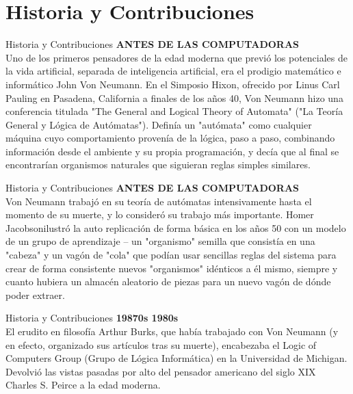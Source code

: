 \documentclass[11pt]{beamer}
\begin{document}
\section{Historia y Contribuciones}
	\begin{frame}{Historia y Contribuciones}
	\justify
	\textbf{ANTES DE LAS COMPUTADORAS}\\
	Uno de los primeros pensadores de la edad moderna que previó los potenciales de la vida artificial, separada de inteligencia artificial, era el prodigio matemático e informático John Von Neumann. En el Simposio Hixon, ofrecido por Linus Carl Pauling en Pasadena, California a finales de los años 40, Von Neumann hizo una conferencia titulada "The General and Logical Theory of Automata" ("La Teoría General y Lógica de Autómatas"). Definía un "autómata" como cualquier máquina cuyo comportamiento provenía de la lógica, paso a paso, combinando información desde el ambiente y su propia programación, y decía que al final se encontrarían organismos naturales que siguieran reglas simples similares. 

	\end{frame}
	
	\begin{frame}{Historia y Contribuciones}
	\justify
	\textbf{ANTES DE LAS COMPUTADORAS}\\
	Von Neumann trabajó en su teoría de autómatas intensivamente hasta el momento de su muerte, y lo consideró su trabajo más importante. Homer Jacobsonilustró la auto replicación de forma básica en los años 50 con un modelo de un grupo de aprendizaje -- un "organismo" semilla que consistía en una "cabeza" y un vagón de "cola" que podían usar sencillas reglas del sistema para crear de forma consistente nuevos "organismos" idénticos a él mismo, siempre y cuanto hubiera un almacén aleatorio de piezas para un nuevo vagón de dónde poder extraer. 


	\end{frame}
	\begin{frame}{Historia y Contribuciones}
	\justify
	\textbf{19870s 1980s}\\
	El erudito en filosofía Arthur Burks, que había trabajado con Von Neumann (y en efecto, organizado sus artículos tras su muerte), encabezaba el Logic of Computers Group (Grupo de Lógica Informática) en la Universidad de Michigan. Devolvió las vistas pasadas por alto del pensador americano del siglo XIX Charles S. Peirce a la edad moderna. 
 

	\end{frame}
\end{document}
